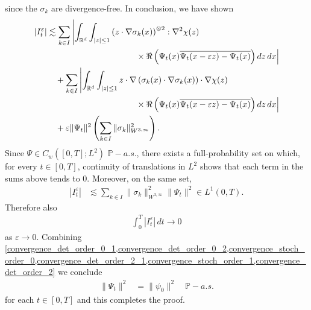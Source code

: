 \documentclass[a4paper,10pt]{amsart}
\newcommand{\R}{\mathbb{R}}
\renewcommand{\epsilon}{\varepsilon}
\theoremstyle{remark}
\numberwithin{equation}{section}
\begin{document}
since the $\sigma_k$ are divergence-free.
In conclusion, we have shown
\begin{align*}
|I^\epsilon_t|
&\lesssim
     \sum_{k\in I}\left\lvert \int_{\R^d}\int_{|z|\leq 1}
     \left(z\cdot\nabla \sigma_k(x)\right)^{\otimes2}:\nabla^2\chi(z)\right.\\
&\hspace{36mm}\left.
     {}\times\Re\left(\Psi_t(x)
     \overline{\Psi_t(x-\epsilon z)-\Psi_t(x)}\right)dz\,dx
     \right\rvert\\
&\quad+\sum_{k\in I}\left\lvert \int_{\R^d}\int_{|z|\leq 1}
     z\cdot\nabla\left(\sigma_k(x)\cdot\nabla\sigma_k(x)\right)
     \cdot\nabla\chi(z)\right.\\
&\hspace{36mm}\left.
     {}\times\Re\left(\Psi_t(x)
     \overline{\Psi_t(x-\epsilon z)-\Psi_t(x)}\right)dz\,dx
     \right\rvert\\
&\quad+\epsilon\|\Psi_t\|^2
\left(\sum_{k\in I}\|\sigma_k\|_{W^{3,\infty}}^2\right).
\end{align*}
Since $\Psi\in C_w([0,T];L^2)$ $\mathbb{P}-a.s.$, there exists a
full-probability set on which, for every $t\in[0,T]$, continuity of
translations in $L^2$ shows that each term in the sums above tends to $0$.
Moreover, on the same set,
\begin{align*}
    |I^{\epsilon}_t|&\lesssim \sum_{k\in I}\|\sigma_k\|_{W^{3,\infty}}^2\|\Psi_t\|^2\in L^1(0,T).
\end{align*}
Therefore also
\begin{align}\label{convergence_det_order_2}
\int_0^T |I_t^\epsilon|\,dt\rightarrow0
\end{align}
as $\epsilon\rightarrow 0$. Combining \cref{convergence_det_order_0_1,convergence_det_order_0_2,convergence_stoch_order_0,convergence_det_order_2_1,convergence_stoch_order_1,convergence_det_order_2}
we conclude
\begin{align*}
    \|\Psi_t\|^2&=\|\psi_0\|^2 \quad \mathbb{P}-a.s.
\end{align*}
for each $t\in [0,T]$ and this completes the proof.




{}

\end{document}
